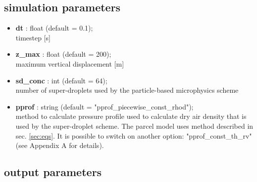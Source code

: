 \documentclass[11pt]{article}
\begin{document}
\subsection{simulation parameters}\label{sec:simpar}

\begin{itemize}

  \item \textbf{dt} : float (default = 0.1); \\ timestep [s]
  \item \textbf{z\_max} : float (default = 200); \\ maximum vertical displacement [m]
  \item \textbf{sd\_conc} : int (default = 64); \\ number of super-droplets used by the particle-based microphysics scheme
  \item \textbf{pprof} : string (default = "pprof\_piecewise\_const\_rhod"); \\ 
                method to calculate pressure profile used to calculate 
                dry air density that is used by the super-droplet scheme. The parcel model uses method described in sec. \ref{sec:eqs}. It is possible to switch on another option: "pprof\_const\_th\_rv" (see Appendix A for details).
\end{itemize}

\subsection{output parameters}\label{sec:output}
\end{document}
